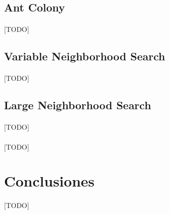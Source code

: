 \documentclass{subfiles}
\begin{document}
      \subsection{Ant Colony}
      \label{sec:solving_ant_colony}

        \paragraph{}
        [TODO]

      \subsection{Variable Neighborhood Search}
      \label{sec:solving_vns}

        \paragraph{}
        [TODO]

      \subsection{Large Neighborhood Search}
      \label{sec:solving_lns}

        \paragraph{}
        [TODO]

      \paragraph{}
      [TODO]

    \section{Conclusiones}
    \label{sec:solving_conclusions}

      \paragraph{}
      [TODO]
\end{document}
